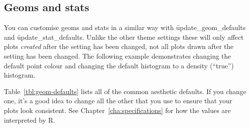 % 


\subsection{Geoms and stats}
\label{sub:geoms_and_stats}

You can customise geoms and stats in a similar way with \f{update_geom_defaults} and \f{update_stat_defaults}.  Unlike the other theme settings these will only affect plots \emph{created} after the setting has been changed, not all plots drawn after the setting has been changed.  The following example demonstrates changing the default point colour and changing the default histogram to a density (``true'') histogram.  

Table~\ref{tbl:geom-defaults} lists all of the common aesthetic defaults.  If you change one, it's a good idea to change all the other that you use to ensure that your plots look consistent.  See Chapter~\ref{cha:specifications} for how the values are interpreted by R.

% 

